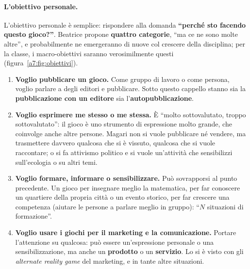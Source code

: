\paragraph{L'obiettivo personale.} L'obiettivo personale è semplice: rispondere alla
domanda \textbf{``perché sto facendo questo gioco?''}. Beatrice propone
\textbf{quattro categorie}, ``ma ce ne sono molte altre'', e probabilmente ne
emergeranno di nuove col crescere della disciplina; per la classe, i macro-obiettivi
saranno verosimilmente questi (figura~\ref{a7:fig:obiettivi}).
\begin{enumerate}
  \item \textbf{Voglio pubblicare un gioco.} Come gruppo di lavoro o come persona,
        voglio parlare a degli editori e pubblicare. Sotto questo cappello stanno sia
        la \textbf{pubblicazione con un editore} sia
        l'\textbf{auto\-pubblicazione}.
  \item \textbf{Voglio esprimere me stesso o me stessa.} È ``molto sottovalutato,
        troppo sottovalutato'': il gioco è uno strumento di espressione molto grande,
        che coinvolge anche altre persone. Magari non si vuole pubblicare né vendere,
        ma trasmettere davvero qualcosa che si è vissuto, qualcosa che si vuole
        raccontare; o si fa attivismo politico e si vuole un'attività che
        sensibilizzi sull'ecologia o su altri temi.
  \item \textbf{Voglio formare, informare o sensibilizzare.} Può sovrapporsi al
        punto precedente. Un gioco per insegnare meglio la matematica, per far
        conoscere un quartiere della propria città o un evento storico, per far
        crescere una competenza (aiutare le persone a parlare meglio in gruppo):
        ``$N$ situazioni di formazione''.
  \item \textbf{Voglio usare i giochi per il marketing e la comunicazione.} Portare
        l'attenzione su qualcosa: può essere un'espressione personale o una
        sensibilizzazione, ma anche un \textbf{prodotto} o un \textbf{servizio}. Lo si
        è visto con gli \emph{alternate reality game} del marketing, e in tante altre
        situazioni.
\end{enumerate}

